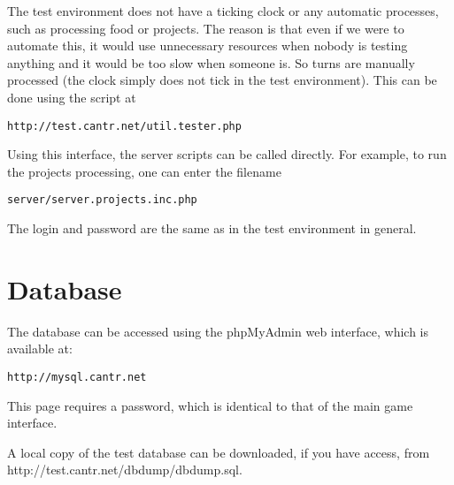 \documentclass[a4paper,12pt]{article}
\begin{document}
The test environment does not have a ticking clock or any automatic processes, such as processing food or projects. The reason is that even if we were to automate this, it would use unnecessary resources when nobody is testing anything and it would be too slow when someone is. So turns are manually processed (the clock simply does not tick in the test environment). This can be done using the script at
\begin{verbatim}
http://test.cantr.net/util.tester.php
\end{verbatim}
Using this interface, the server scripts can be called directly. For example, to run the projects processing, one can enter the filename
\begin{verbatim}
server/server.projects.inc.php
\end{verbatim}
The login and password are the same as in the test environment in general.

\section{Database}

The database can be accessed using the phpMyAdmin web interface, which is available at:
\begin{verbatim}
http://mysql.cantr.net
\end{verbatim}
This page requires a password, which is identical to that of the main game interface.

A local copy of the test database can be downloaded, if you have access, from http://test.cantr.net/dbdump/dbdump.sql.
\end{document}
